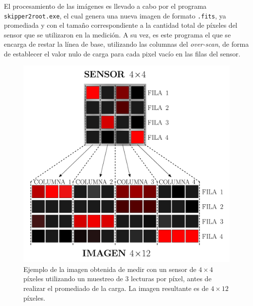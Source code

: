 El procesamiento de las imágenes es llevado a cabo por el programa \verb|skipper2root.exe|, el cual genera una nueva imagen de formato \verb|.fits|, ya promediada y con el tamaño correspondiente a la cantidad total de píxeles del sensor que se utilizaron en la medición. 
A su vez, es este programa el que se encarga de restar la línea de base, utilizando las columnas del \textit{over-scan}, de forma de establecer el valor nulo de carga para cada pixel vacío en las filas del sensor.
\begin{figure}[h]
    \centering
    \includegraphics[scale=0.4]{Figs/skipper2root_scheme.pdf}
    \caption{Ejemplo de la imagen obtenida de medir con un sensor de $4\times4$ píxeles utilizando un muestreo de $3$ lecturas por píxel, antes de realizar el promediado de la carga. La imagen resultante es de $4\times 12$ píxeles.}
    \label{fig:Skipper2root_esquema}
\end{figure}



